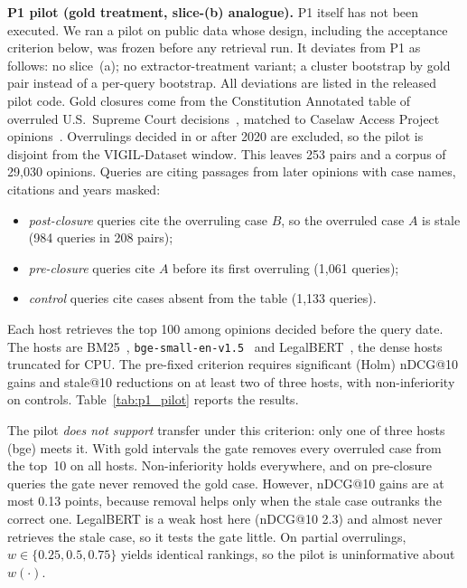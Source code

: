 \textbf{P1 pilot (gold treatment, slice-(b) analogue).} P1 itself has not been executed. We ran a pilot on public data whose design, including the acceptance criterion below, was frozen before any retrieval run. It deviates from P1 as follows: no slice~(a); no extractor-treatment variant; a cluster bootstrap by gold pair instead of a per-query bootstrap. All deviations are listed in the released pilot code. Gold closures come from the Constitution Annotated table of overruled U.S.\ Supreme Court decisions~\citep{conan2022}, matched to Caselaw Access Project opinions~\citep{cap2024}. Overrulings decided in or after 2020 are excluded, so the pilot is disjoint from the VIGIL-Dataset window. This leaves 253 pairs and a corpus of 29{,}030 opinions. Queries are citing passages from later opinions with case names, citations and years masked:
\begin{itemize}[leftmargin=1.2em,itemsep=1pt,topsep=2pt]
  \item \emph{post-closure} queries cite the overruling case $B$, so the overruled case $A$ is stale (984 queries in 208 pairs);
  \item \emph{pre-closure} queries cite $A$ before its first overruling (1{,}061 queries);
  \item \emph{control} queries cite cases absent from the table (1{,}133 queries).
\end{itemize}
Each host retrieves the top 100 among opinions decided before the query date. The hosts are BM25~\citep{robertson2009bm25}, \texttt{bge-small-en-v1.5}~\citep{xiao2024cpack} and LegalBERT~\citep{chalkidis2020legalbert}, the dense hosts truncated for CPU. The pre-fixed criterion requires significant (Holm) nDCG@10 gains and stale@10 reductions on at least two of three hosts, with non-inferiority on controls. Table~\ref{tab:p1_pilot} reports the results.

The pilot \emph{does not support} transfer under this criterion: only one of three hosts (bge) meets it. With gold intervals the gate removes every overruled case from the top~10 on all hosts. Non-inferiority holds everywhere, and on pre-closure queries the gate never removed the gold case. However, nDCG@10 gains are at most 0.13 points, because removal helps only when the stale case outranks the correct one. LegalBERT is a weak host here (nDCG@10 2.3) and almost never retrieves the stale case, so it tests the gate little. On partial overrulings, $w\!\in\!\{0.25,0.5,0.75\}$ yields identical rankings, so the pilot is uninformative about $w(\cdot)$.

